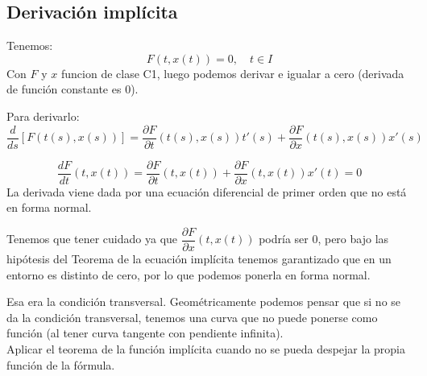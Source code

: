 \subsection{Derivación implícita}
\begin{ejemplo}
    Tenemos:
    \begin{equation*}
        F(t,x(t)) = 0, \quad t\in I
    \end{equation*}
    Con $F$ y $x$ funcion de clase C1, luego podemos derivar e igualar a cero (derivada de función constante es 0).

    Para derivarlo:
    \begin{equation*}
        \dfrac{d}{ds}[ F(t(s),x(s))] = \dfrac{\partial F}{\partial t}(t(s), x(s))t'(s) + \dfrac{\partial F}{\partial x}(t(s),x(s))x'(s)
    \end{equation*}

    \begin{equation*}
        \dfrac{dF}{dt}(t,x(t)) = \dfrac{\partial F}{\partial t}(t,x(t)) + \dfrac{\partial F}{\partial x}(t,x(t))x'(t) = 0
    \end{equation*}
    La derivada viene dada por una ecuación diferencial de primer orden que no está en forma normal.

    Tenemos que tener cuidado ya que $\dfrac{\partial F}{\partial x}(t,x(t))$ podría ser 0, pero bajo las hipótesis del Teorema de la ecuación implícita tenemos garantizado que en un entorno es distinto de cero, por lo que podemos ponerla en forma normal.

    Esa era la condición transversal. Geométricamente podemos pensar que si no se da la condición transversal, tenemos una curva que no puede ponerse como función (al tener curva tangente con pendiente infinita).\\

    Aplicar el teorema de la función implícita cuando no se pueda despejar la propia función de la fórmula.
\end{ejemplo}

